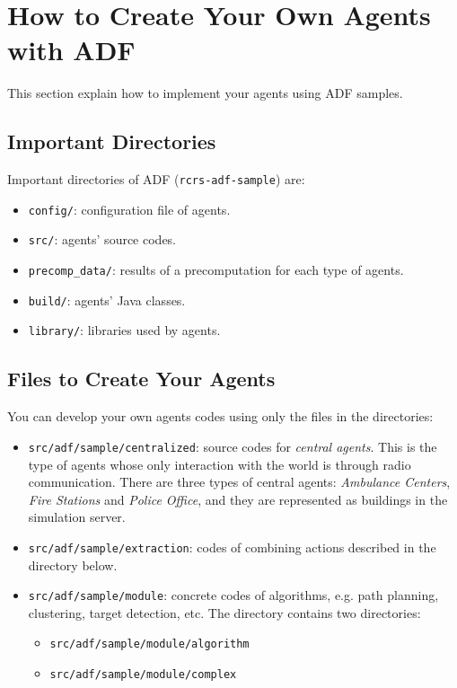 \documentclass{article}
\begin{document}
\section{How to Create Your Own Agents with ADF}
This section explain how to implement your agents using ADF samples.
\subsection{Important Directories}
Important directories of ADF (\texttt{rcrs-adf-sample}) are:
\begin{itemize}
 \item \texttt{config/}: configuration file of agents.
 \item \texttt{src/}: agents' source codes.
 \item \texttt{precomp\_data/}: results of a precomputation for each type of agents.
 \item \texttt{build/}: agents' Java classes.
 \item \texttt{library/}: libraries used by agents.
\end{itemize}
\subsection{Files to Create Your Agents}
You can develop your own agents codes using only the files in the directories:
\begin{itemize}
 \item \texttt{src/adf/sample/centralized}: source codes for {\itshape central agents}. This is the type of agents whose only interaction with the world is through radio communication. There are three types of central agents: \textit{Ambulance Centers}, \textit{Fire Stations} and \textit{Police Office}, and they are represented as buildings in the simulation server.
 \item \texttt{src/adf/sample/extraction}: codes of combining actions described in the directory below.
 \item \texttt{src/adf/sample/module}: concrete codes of algorithms, e.g. path planning, clustering, target detection, etc. The directory contains two directories:
 \begin{itemize}
    \item \texttt{src/adf/sample/module/algorithm}
    \item \texttt{src/adf/sample/module/complex}
 \end{itemize}
\end{itemize}
\end{document}

